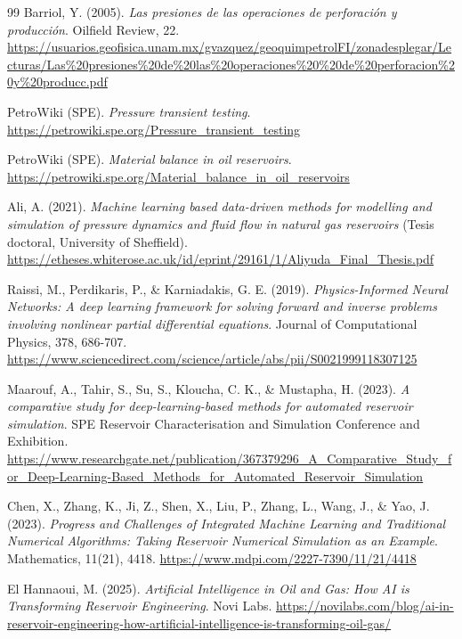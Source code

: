 \documentclass[12pt,a4paper]{article}
\begin{document}
\begin{thebibliography}{99}
   Barriol, Y. (2005). \textit{Las presiones de las operaciones de perforación y
  producción}. Oilfield Review, 22.
  \url{https://usuarios.geofisica.unam.mx/gvazquez/geoquimpetrolFI/zonadesplegar/Lecturas/Las\%20presiones\%20de\%20las\%20operaciones\%20\%20de\%20perforacion\%20y\%20producc.pdf}

   PetroWiki (SPE). \textit{Pressure transient testing}.
  \url{https://petrowiki.spe.org/Pressure_transient_testing}

   PetroWiki (SPE). \textit{Material balance in oil reservoirs}.
  \url{https://petrowiki.spe.org/Material_balance_in_oil_reservoirs}

   Ali, A. (2021). \textit{Machine learning based data-driven methods for modelling and
  simulation of pressure dynamics and fluid flow in natural gas reservoirs} (Tesis doctoral, University of
  Sheffield).
  \url{https://etheses.whiterose.ac.uk/id/eprint/29161/1/Aliyuda_Final_Thesis.pdf}

   Raissi, M., Perdikaris, P., \& Karniadakis, G. E. (2019). \textit{Physics-Informed Neural
  Networks: A deep learning framework for solving forward and inverse problems involving nonlinear partial
  differential equations}. Journal of Computational Physics, 378, 686-707.
  \url{https://www.sciencedirect.com/science/article/abs/pii/S0021999118307125}

   Maarouf, A., Tahir, S., Su, S., Kloucha, C. K., \& Mustapha, H. (2023). \textit{A
  comparative study for deep-learning-based methods for automated reservoir simulation}. SPE Reservoir
  Characterisation and Simulation Conference and Exhibition.
  \url{https://www.researchgate.net/publication/367379296_A_Comparative_Study_for_Deep-Learning-Based_Methods_for_Automated_Reservoir_Simulation}

   Chen, X., Zhang, K., Ji, Z., Shen, X., Liu, P., Zhang, L., Wang, J., \& Yao, J. (2023).
  \textit{Progress and Challenges of Integrated Machine Learning and Traditional Numerical Algorithms:
  Taking Reservoir Numerical Simulation as an Example}. Mathematics, 11(21), 4418.
  \url{https://www.mdpi.com/2227-7390/11/21/4418}

   El Hannaoui, M. (2025). \textit{Artificial Intelligence in Oil and Gas: How AI is
  Transforming Reservoir Engineering}. Novi Labs.
  \url{https://novilabs.com/blog/ai-in-reservoir-engineering-how-artificial-intelligence-is-transforming-oil-gas/}


\end{thebibliography}
\end{document}
